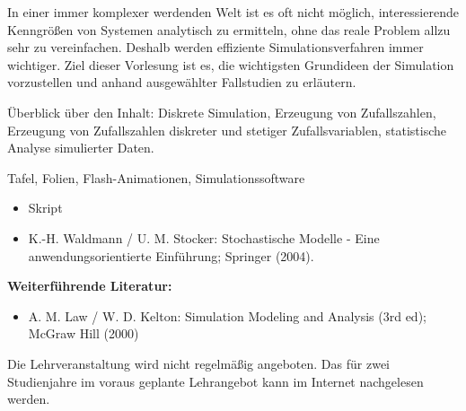 \begin{course}
\begin{content}
In einer immer komplexer werdenden Welt ist es oft nicht möglich, interessierende Kenngrößen von Systemen analytisch zu ermitteln, ohne das reale Problem allzu sehr zu vereinfachen. Deshalb werden effiziente Simulationsverfahren immer wichtiger. Ziel dieser Vorlesung ist es, die wichtigsten Grundideen der Simulation vorzustellen und anhand ausgewählter Fallstudien zu erläutern.

 

Überblick über den Inhalt: Diskrete Simulation, Erzeugung von Zufallszahlen, Erzeugung von Zufallszahlen diskreter und stetiger Zufallsvariablen, statistische Analyse simulierter Daten.


\end{content}

\begin{media}Tafel, Folien, Flash-Animationen, Simulationssoftware

\end{media}

\begin{literature}\begin{itemize}\item Skript  \item K.-H. Waldmann / U. M. Stocker: Stochastische Modelle - Eine anwendungsorientierte Einführung; Springer (2004).  \end{itemize}

\textbf{Weiterführende Literatur:}

 \begin{itemize}\item A. M. Law / W. D. Kelton: Simulation Modeling and Analysis (3rd ed); McGraw Hill (2000)  \end{itemize}\end{literature}

\begin{remarks}Die Lehrveranstaltung wird nicht regelmäßig angeboten. Das für zwei Studienjahre im voraus geplante Lehrangebot kann im Internet nachgelesen werden.

\end{remarks}

\end{course}